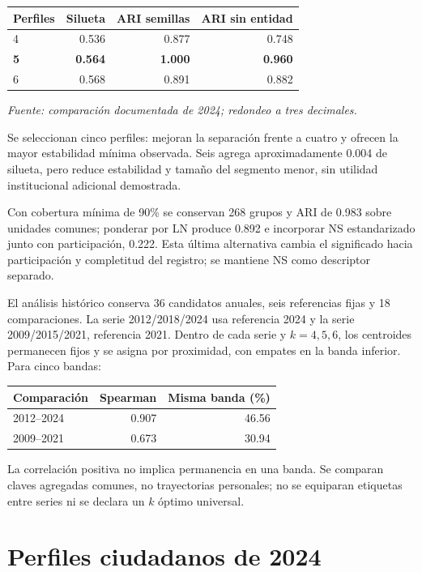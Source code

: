 \documentclass[11pt]{article}
\begin{document}
\begingroup
\centering
\begin{tabular}{@{}lrrr@{}}
\hline
\textbf{Perfiles} & \textbf{Silueta} & \textbf{ARI semillas} & \textbf{ARI sin entidad} \\ \hline
4 & 0.536 & 0.877 & 0.748 \\
\textbf{5} & \textbf{0.564} & \textbf{1.000} & \textbf{0.960} \\
6 & 0.568 & 0.891 & 0.882 \\ \hline
\end{tabular}\par
\endgroup
\textit{Fuente: comparación documentada de 2024; redondeo a tres decimales.}

Se seleccionan cinco perfiles: mejoran la separación frente a cuatro y ofrecen la mayor estabilidad mínima observada. Seis agrega aproximadamente 0.004 de silueta, pero reduce estabilidad y tamaño del segmento menor, sin utilidad institucional adicional demostrada.

Con cobertura mínima de 90\% se conservan 268 grupos y ARI de 0.983 sobre unidades comunes; ponderar por LN produce 0.892 e incorporar NS estandarizado junto con participación, 0.222. Esta última alternativa cambia el significado hacia participación y completitud del registro; se mantiene NS como descriptor separado.

El análisis histórico conserva 36 candidatos anuales, seis referencias fijas y 18 comparaciones. La serie 2012/2018/2024 usa referencia 2024 y la serie 2009/2015/2021, referencia 2021. Dentro de cada serie y $k=4,5,6$, los centroides permanecen fijos y se asigna por proximidad, con empates en la banda inferior. Para cinco bandas:

\begingroup
\centering
\begin{tabular}{@{}lrr@{}}
\hline
\textbf{Comparación} & \textbf{Spearman} & \textbf{Misma banda (\%)} \\ \hline
2012--2024 & 0.907 & 46.56 \\
2009--2021 & 0.673 & 30.94 \\ \hline
\end{tabular}\par
\endgroup

La correlación positiva no implica permanencia en una banda. Se comparan claves agregadas comunes, no trayectorias personales; no se equiparan etiquetas entre series ni se declara un $k$ óptimo universal.

\section{Perfiles ciudadanos de 2024}
\end{document}
